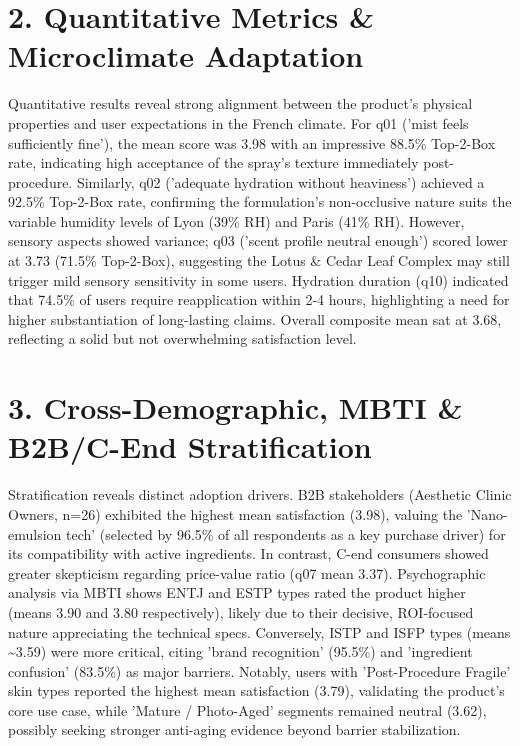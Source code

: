 \documentclass[10pt,twocolumn,a4paper]{article}
\begin{document}
\section{2. Quantitative Metrics \& Microclimate Adaptation}
Quantitative results reveal strong alignment between the product's physical properties and user expectations in the French climate. For q01 ('mist feels sufficiently fine'), the mean score was 3.98 with an impressive 88.5\% Top-2-Box rate, indicating high acceptance of the spray's texture immediately post-procedure. Similarly, q02 ('adequate hydration without heaviness') achieved a 92.5\% Top-2-Box rate, confirming the formulation's non-occlusive nature suits the variable humidity levels of Lyon (39\% RH) and Paris (41\% RH). However, sensory aspects showed variance; q03 ('scent profile neutral enough') scored lower at 3.73 (71.5\% Top-2-Box), suggesting the Lotus \& Cedar Leaf Complex may still trigger mild sensory sensitivity in some users. Hydration duration (q10) indicated that 74.5\% of users require reapplication within 2-4 hours, highlighting a need for higher substantiation of long-lasting claims. Overall composite mean sat at 3.68, reflecting a solid but not overwhelming satisfaction level.
\section{3. Cross-Demographic, MBTI \& B2B/C-End Stratification}
Stratification reveals distinct adoption drivers. B2B stakeholders (Aesthetic Clinic Owners, n=26) exhibited the highest mean satisfaction (3.98), valuing the 'Nano-emulsion tech' (selected by 96.5\% of all respondents as a key purchase driver) for its compatibility with active ingredients. In contrast, C-end consumers showed greater skepticism regarding price-value ratio (q07 mean 3.37). Psychographic analysis via MBTI shows ENTJ and ESTP types rated the product higher (means 3.90 and 3.80 respectively), likely due to their decisive, ROI-focused nature appreciating the technical specs. Conversely, ISTP and ISFP types (means \textasciitilde{}3.59) were more critical, citing 'brand recognition' (95.5\%) and 'ingredient confusion' (83.5\%) as major barriers. Notably, users with 'Post-Procedure Fragile' skin types reported the highest mean satisfaction (3.79), validating the product's core use case, while 'Mature / Photo-Aged' segments remained neutral (3.62), possibly seeking stronger anti-aging evidence beyond barrier stabilization.
\end{document}
